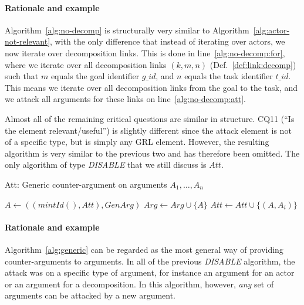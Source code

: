 \paragraph{Rationale and example} Algorithm~\ref{alg:no-decomp} is structurally very similar to Algorithm~\ref{alg:actor-not-relevant}, with the only difference that instead of iterating over actors, we now iterate over decomposition links. This is done in line~\ref{alg:no-decomp:for}, where we iterate over all decomposition links $(k,m,n)$ (Def.~\ref{def:link:decomp}) such that $m$ equals the goal identifier $g\_id$, and $n$ equals the task identifier $t\_id$. This means we iterate over all decomposition links from the goal to the task, and we attack all arguments for these links on line~\ref{alg:no-decomp:att}.

Almost all of the remaining critical questions are similar in structure. CQ11 (``Is the element relevant/useful'') is slightly different since the attack element is not of a specific type, but is simply any GRL element. However, the resulting algorithm is very similar to the previous two and has therefore been omitted. The only algorithm of type \emph{DISABLE} that we still discuss is $Att$.

\begin{algorithm}[h]
  \caption{Att: Generic counter-argument on arguments $A_1,\ldots,A_n$}\label{alg:generic}
  \begin{algorithmic}[1]
    \State $A \leftarrow ((mintId(),Att),GenArg)$\label{alg:generic:arg}
    \State $Arg\leftarrow Arg \cup \{A\}$\label{alg:generic:addarg}
    \label{alg:generic:for}
      \State $Att \leftarrow Att \cup \{(A,A_i)\}$\label{alg:generic:att}
    \EndFor
    \EndProcedure
  \end{algorithmic}
\end{algorithm}

\paragraph{Rationale and example} Algorithm~\ref{alg:generic} can be regarded as the most general way of providing counter-arguments to arguments. In all of the previous \emph{DISABLE} algorithm, the attack was on a specific type of argument, for instance an argument for an actor or an argument for a decomposition. In this algorithm, however, \emph{any} set of arguments can be attacked by a new argument.


